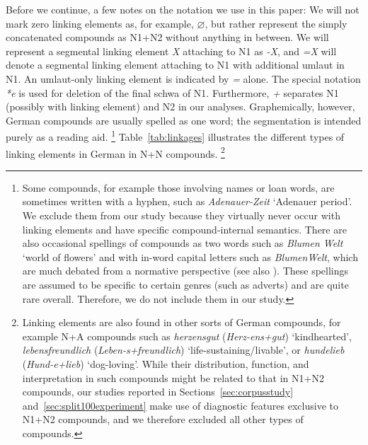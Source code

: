 Before we continue, a few notes on the notation we use in this paper:
We will not mark zero linking elements as, for example, $\varnothing$, but rather represent the simply concatenated compounds as N1+N2 without anything in between.
We will represent a segmental linking element \textit{X} attaching to N1 as \textit{-X}, and \textit{=X} will denote a segmental linking element attaching to N1 with additional umlaut in N1.
An umlaut-only linking element is indicated by \textit{=} alone.
The special notation \textit{*e} is used for deletion of the final schwa of N1.
Furthermore, \textit{+} separates N1 (possibly with linking element) and N2 in our analyses.
Graphemically, however, German compounds are usually spelled as one word; the segmentation is intended purely as a reading aid.%
	\footnote{Some compounds, for example those involving names or loan words, are sometimes written with a hyphen, such as \textit{Adenauer-Zeit} `Adenauer period'.
	We exclude them from our study because they virtually never occur with linking elements and have specific compound-internal semantics.
	There are also occasional spellings of compounds as two words such as \textit{Blumen Welt} `world of flowers' and with in-word capital letters such as \textit{BlumenWelt}, which are much debated from a normative perspective (see also \citealt{Scherer2012}).
	These spellings are assumed to be specific to certain genres (such as adverts) and are quite rare overall.
	Therefore, we do not include them in our study.}
Table~\ref{tab:linkages} illustrates the different types of linking elements in German in N+N compounds.%
	\footnote{Linking elements are also found in other sorts of German compounds, for example N+A compounds such as \textit{herzensgut} (\textit{Herz-ens+gut}) `kindhearted', \textit{lebensfreundlich} (\textit{Leben-s+freundlich}) `life-sustaining\slash livable', or \textit{hundelieb} (\textit{Hund-e+lieb}) `dog-loving'.
	While their distribution, function, and interpretation in such compounds might be related to that in N1+N2 compounds, our studies reported in Sections~\ref{sec:corpusstudy} and~\ref{sec:split100experiment} make use of diagnostic features exclusive to N1+N2 compounds, and we therefore excluded all other types of compounds.}

